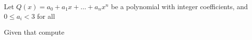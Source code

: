 Let $Q(x)=a_0+a_1x+\dots+a_nx^n$ be a polynomial with integer coefficients, and $0\le a_i<3$ for all 

Given that  compute 
